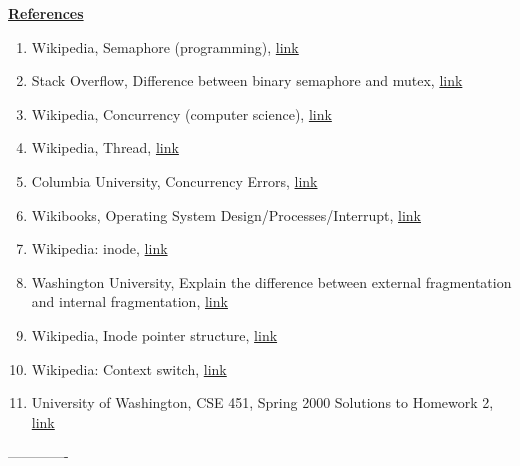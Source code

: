 \documentclass[12pt]{article}
\begin{document}
\bigskip

\underline{\textbf{References}}

\begin{enumerate}[1)]
    \item Wikipedia, Semaphore (programming), \href{https://en.wikipedia.org/wiki/Semaphore_(programming)}{link}
    \item Stack Overflow, Difference between binary semaphore and mutex, \href{https://stackoverflow.com/questions/62814/difference-between-binary-semaphore-and-mutex}{link}
    \item Wikipedia, Concurrency (computer science), \href{https://en.wikipedia.org/wiki/Concurrency_(computer_science)}{link}
    \item Wikipedia, Thread, \href{https://en.wikipedia.org/wiki/Thread_(computing)#:~:text=In%20computer%20science%2C%20a%20thread,part%20of%20the%20operating%20system.}{link}
    \item Columbia University, Concurrency Errors, \href{https://www.cs.columbia.edu/~junfeng/13fa-w4118/lectures/l11-concurrency-error.pdf}{link}
    \item Wikibooks, Operating System Design/Processes/Interrupt, \href{https://en.wikibooks.org/wiki/Operating_System_Design/Processes/Interrupt#:~:text=Perhaps%20the%20most%20important%20interrupt,processor%20executing%20a%20specific%20instruction.}{link}
    \item Wikipedia: inode, \href{https://en.wikipedia.org/wiki/Inode}{link}
    \item Washington University, Explain the difference between external fragmentation
    and internal fragmentation, \href{https://courses.cs.washington.edu/courses/cse451/00sp/misc/quiz2sol.txt}{link}
    \item Wikipedia, Inode pointer structure, \href{https://en.wikipedia.org/wiki/Inode_pointer_structure}{link}
    \item Wikipedia: Context switch, \href{https://en.wikipedia.org/wiki/Context_switch}{link}
    \item University of Washington, CSE 451, Spring 2000 Solutions to Homework 2, \href{https://courses.cs.washington.edu/courses/cse451/00sp/homeworks/hw2soln.txt}{link}
\end{enumerate}

-------------
\end{document}
